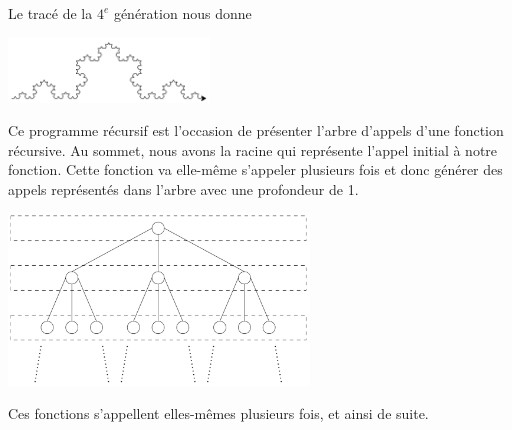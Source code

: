 \documentclass{magnolia}
\begin{document}
Le tracé de la $4^e$ génération nous donne
\begin{center}
\includegraphics[width=0.4\textwidth]{../../Commun/Images/python-cours-koch-4}
\end{center}
Ce programme récursif est l'occasion de présenter l'arbre d'appels d'une fonction
récursive. Au sommet, nous avons la racine qui représente l'appel initial à notre
fonction. Cette fonction va elle-même s'appeler plusieurs fois et donc
générer des appels représentés dans l'arbre avec une profondeur de 1.
\begin{center}
\includegraphics[width=0.6\textwidth]{../../Commun/Images/python-cours-arbre-appel}
\end{center}
Ces fonctions s'appellent elles-mêmes plusieurs fois, et ainsi de suite.\\
\end{document}
